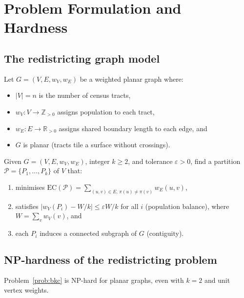 \section{Problem Formulation and Hardness}
\label{sec:formulation}

\subsection{The redistricting graph model}

Let $G = (V, E, w_V, w_E)$ be a weighted planar graph where:
\begin{itemize}
  \item $|V| = n$ is the number of census tracts,
  \item $w_V : V \to \mathbb{Z}_{>0}$ assigns population to each tract,
  \item $w_E : E \to \mathbb{R}_{>0}$ assigns shared boundary length to
    each edge, and
  \item $G$ is planar (tracts tile a surface without crossings).
\end{itemize}

\begin{problem}
\label{prob:bkc}
Given $G = (V, E, w_V, w_E)$, integer $k \geq 2$, and tolerance
$\varepsilon > 0$, find a partition $\mathcal{P} = \{P_1, \ldots, P_k\}$
of $V$ that:
\begin{enumerate}
  \item minimises $\mathrm{EC}(\mathcal{P}) = \sum_{(u,v) \in E,\, \pi(u) \neq \pi(v)} w_E(u,v)$,
  \item satisfies $|w_V(P_i) - W/k| \leq \varepsilon W/k$ for all $i$
    (population balance), where $W = \sum_v w_V(v)$, and
  \item each $P_i$ induces a connected subgraph of $G$ (contiguity).
\end{enumerate}
\end{problem}

\subsection{NP-hardness of the redistricting problem}

\begin{theorem}[NP-hardness]
\label{thm:nphard}
Problem~\ref{prob:bkc} is NP-hard for planar graphs, even with $k = 2$
and unit vertex weights.
\end{theorem}

